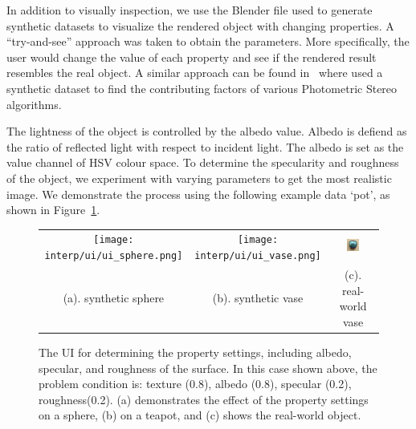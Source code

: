 
In addition to visually inspection, we use the Blender file used to generate synthetic datasets to visualize the rendered object with changing properties. A ``try-and-see'' approach was taken to obtain the parameters. More specifically, the user would change the value of each property and see if the rendered result resembles the real object. A similar approach can be found in~\cite{Berkiten:2016:ARB} where \citeauthor{Berkiten:2016:ARB} used a synthetic dataset to find the contributing factors of various Photometric Stereo algorithms.

The lightness of the object is controlled by the albedo value. Albedo is defiend as the ratio of reflected light with respect to incident light. The albedo is set as the value channel of HSV colour space. To determine the specularity and roughness of the object, we experiment with varying parameters to get the most realistic image. We demonstrate the process using the following example data `pot', as shown in Figure~\ref{fig:ui}.
\begin{figure}[!htbp]
\centering
\begin{tabular}{ccc}
  \texttt{[image: interp/ui/ui\_sphere.png]}&
  \texttt{[image: interp/ui/ui\_vase.png]}&
  \includegraphics[width=0.3\textwidth]{img/interp/real_world_img/vase/vase.jpg}\\
  (a). synthetic sphere & (b). synthetic vase & (c). real-world vase\\
\end{tabular}
\caption{The UI for determining the property settings, including albedo, specular, and roughness of the surface. In this case shown above, the problem condition is: texture (0.8), albedo (0.8), specular (0.2), roughness(0.2). (a) demonstrates the effect of the property settings on a sphere, (b) on a teapot, and (c) shows the real-world object.}
\label{fig:ui}
\end{figure}

